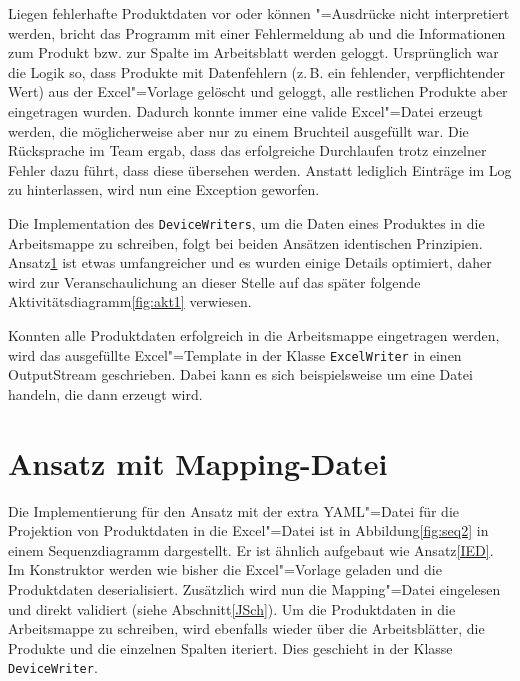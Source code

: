 Liegen fehlerhafte Produktdaten vor oder können "=Ausdrücke nicht interpretiert werden, bricht das Programm mit einer Fehlermeldung ab und die Informationen zum Produkt bzw. zur Spalte im Arbeitsblatt werden geloggt. Ursprünglich war die Logik so, dass Produkte mit Datenfehlern (z.\,B. ein fehlender, verpflichtender Wert) aus der Excel"=Vorlage gelöscht und geloggt, alle restlichen Produkte aber eingetragen wurden. Dadurch konnte immer eine valide Excel"=Datei erzeugt werden, die möglicherweise aber nur zu einem Bruchteil ausgefüllt war. Die Rücksprache im Team ergab, dass das erfolgreiche Durchlaufen trotz einzelner Fehler dazu führt, dass diese übersehen werden. Anstatt lediglich Einträge im Log zu hinterlassen, wird nun eine Exception geworfen. 

Die Implementation des \texttt{DeviceWriters}, um die Daten eines Produktes in die Arbeitsmappe zu schreiben, folgt bei beiden Ansätzen identischen Prinzipien. Ansatz\nbs\ref{IMD} ist etwas umfangreicher und es wurden einige Details optimiert, daher wird zur Veranschaulichung an dieser Stelle auf das später folgende Aktivitätsdiagramm\nbs\ref{fig:akt1} verwiesen. 

Konnten alle Produktdaten erfolgreich in die Arbeitsmappe eingetragen werden, wird das ausgefüllte Excel"=Template in der Klasse \texttt{ExcelWriter} in einen OutputStream geschrieben. Dabei kann es sich beispielsweise um eine Datei handeln, die dann erzeugt wird. 





\section{Ansatz mit Mapping-Datei} \label{IMD}

Die Implementierung für den Ansatz mit der extra YAML"=Datei für die Projektion von Produktdaten in die Excel"=Datei ist in Abbildung\nbs\ref{fig:seq2} in einem Sequenzdiagramm dargestellt. Er ist ähnlich aufgebaut wie Ansatz\nbs\ref{IED}. Im Konstruktor werden wie bisher die Excel"=Vorlage geladen und die Produktdaten deserialisiert. Zusätzlich wird nun die Mapping"=Datei eingelesen und direkt validiert (siehe Abschnitt\nbs\ref{JSch}). Um die Produktdaten in die Arbeitsmappe zu schreiben, wird ebenfalls wieder über die Arbeitsblätter, die Produkte und die einzelnen Spalten iteriert. Dies geschieht in der Klasse \texttt{DeviceWriter}. 

